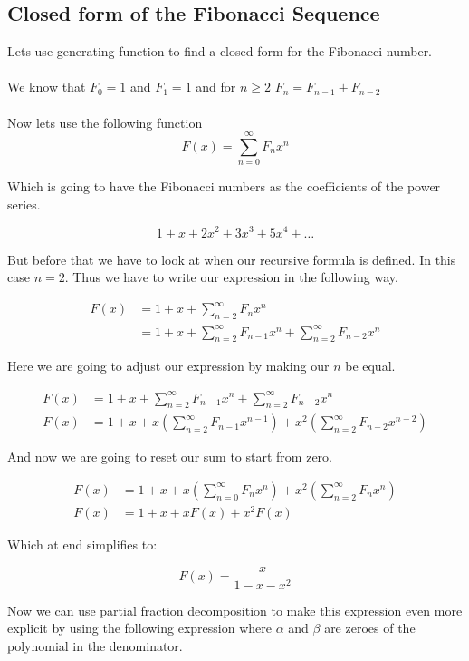\subsection{Closed form of the Fibonacci Sequence}

Lets use generating function to find a closed form for the Fibonacci number. 
\\\\
We know that \(F_0 = 1\) and \(F_1 = 1\) and for \(n \ge 2\) \(F_n = F_{n-1} + F_{n-2}\)
\\\\
Now lets use the following function
\[
    F(x) = \sum_{n = 0}^{\infty} F_n x^{n}
\]

Which is going to have the Fibonacci numbers as the coefficients of the power series.

\[
    1 + x + 2x^2 + 3x^3 + 5x^4 + \dots
\]

But before that we have to look at when our recursive formula is defined.
In this case \(n = 2\). Thus we have to write our expression in the following way.

\begin{align*}
F(x) &= 1 + x + \sum_{n = 2}^{\infty} F_n x^{n}\\
&= 1 + x + \sum_{n = 2}^{\infty} F_{n -1} x^{n} + \sum_{n = 2}^{\infty} F_{n - 2}x^n 
\end{align*}

Here we are going to adjust our expression by making our \(n\) be equal.

\begin{align*}
F(x) &= 1 + x + \sum_{n = 2}^{\infty} F_{n -1} x^{n} + \sum_{n = 2}^{\infty} F_{n - 2}x^n \\ 
F(x) &= 1 + x + x \left( \sum_{n = 2}^{\infty} F_{n -1} x^{n-1}\right) + x^2 \left( \sum_{n = 2}^{\infty} F_{n -2} x^{n-2}\right)
\end{align*}

And now we are going to reset our sum to start from zero.

\begin{align*}
F(x) &= 1 + x + x \left( \sum_{n = 0}^{\infty} F_{n} x^{n}\right) + x^2 \left( \sum_{n = 2}^{\infty} F_{n} x^{n}\right)\\
F(x) &= 1 + x + x F(x) + x^2 F(x)
\end{align*}

Which at end simplifies to:

\[
F(x) = \frac{x}{1 - x - x^2}
\]

Now we can use partial fraction decomposition to make this expression even more explicit
by using the following expression where \(\alpha\) and \(\beta\) are zeroes of the polynomial in the
denominator.

